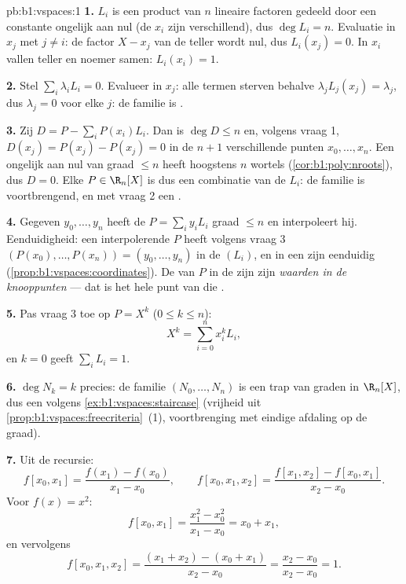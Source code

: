 \begin{solution}{pb:b1:vspaces:1}
\textbf{1.} $L_i$ is een product van $n$ lineaire factoren gedeeld
door een constante ongelijk aan nul (de $x_i$ zijn verschillend),
dus $\deg L_i = n$. Evaluatie in $x_j$ met $j \neq i$: de factor
$X - x_j$ van de teller wordt nul, dus $L_i(x_j) = 0$. In $x_i$
vallen teller en noemer samen: $L_i(x_i) = 1$.

\textbf{2.} Stel $\sum_i \lambda_i L_i = 0$. Evalueer in $x_j$:
alle termen sterven behalve $\lambda_j L_j(x_j) = \lambda_j$, dus
$\lambda_j = 0$ voor elke $j$: de familie is .

\textbf{3.} Zij $D = P - \sum_i P(x_i) L_i$. Dan is $\deg D \leq n$
en, volgens vraag 1, $D(x_j) = P(x_j) - P(x_j) = 0$ in de $n + 1$
verschillende punten $x_0, \dots, x_n$. Een  ongelijk aan
nul van graad $\leq n$ heeft hoogstens $n$ wortels
(\cref{cor:b1:poly:nroots}), dus $D = 0$. Elke $P \in \R_n[X]$ is
dus een combinatie van de $L_i$: de familie is voortbrengend, en
met vraag 2 een .

\textbf{4.} Gegeven $y_0, \dots, y_n$ heeft de  $P = \sum_i
y_i L_i$ graad $\leq n$ en interpoleert hij. Eenduidigheid: een
interpolerende $P$ heeft volgens vraag 3  $(P(x_0),
\dots, P(x_n)) = (y_0, \dots, y_n)$ in de  $(L_i)$, en
 in een  zijn eenduidig
(\cref{prop:b1:vspaces:coordinates}). De  van $P$ in de
 zijn zijn \emph{waarden in de knooppunten} --- dat
is het hele punt van die .

\textbf{5.} Pas vraag 3 toe op $P = X^k$ ($0 \leq k \leq n$):
\[
X^k = \sum_{i=0}^{n} x_i^{k} L_i ,
\]
en $k = 0$ geeft $\sum_i L_i = 1$.

\textbf{6.} $\deg N_k = k$ precies: de familie $(N_0, \dots, N_n)$
is een trap van graden in $\R_n[X]$, dus een  volgens
\cref{ex:b1:vspaces:staircase} (vrijheid uit
\cref{prop:b1:vspaces:freecriteria}~(1), voortbrenging met eindige
afdaling op de graad).

\textbf{7.} Uit de recursie:
\[
f[x_0, x_1] = \frac{f(x_1) - f(x_0)}{x_1 - x_0},
\qquad
f[x_0, x_1, x_2] = \frac{f[x_1, x_2] - f[x_0, x_1]}{x_2 - x_0}.
\]
Voor $f(x) = x^2$:
\[
f[x_0, x_1] = \frac{x_1^2 - x_0^2}{x_1 - x_0} = x_0 + x_1,
\]
en vervolgens
\[
f[x_0, x_1, x_2]
= \frac{(x_1 + x_2) - (x_0 + x_1)}{x_2 - x_0}
= \frac{x_2 - x_0}{x_2 - x_0} = 1 .
\]


\end{solution}
